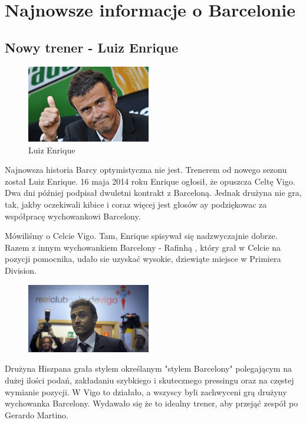 \documentclass[11pt, a4paper]{article}
\begin{document}
\section{Najnowsze informacje o Barcelonie}
\subsection{Nowy trener - Luiz Enrique}
\begin{figure}
\begin{center}
\includegraphics[width=0.48\textwidth]{luzienrique.jpg}
\end{center}
\caption{Luiz Enrique\cite{Enrique}}
\label{img:Luiz}
\end{figure}
Najnowsza historia Barcy optymistyczna nie jest. Trenerem od nowego sezonu został Luiz Enrique.
16 maja 2014 roku Enrique ogłosił, że opuszcza Celtę Vigo. Dwa dni później podpisał dwuletni kontrakt z Barceloną. Jednak drużyna nie gra, tak, jakby oczekiwali kibice i coraz więcej jest głosów ay podziękowac za współpracę wychowankowi Barcelony.

Mówiliśmy o Celcie Vigo. Tam, Enrique spisywał się nadzwyczajnie dobrze. Razem z innym wychowankiem Barcelony - Rafinhą , który grał w Celcie na pozycji pomocnika, udało sie uzyskać wysokie, dziewiąte miejsce w Primiera Division.

\begin{figure}
\begin{center}
\includegraphics[width=0.48\textwidth]{enrique2.jpg}
\end{center}
\label{img:Luiz2}
\end{figure}
Drużyna Hiszpana grała stylem określanym "stylem Barcelony" polegającym na dużej ilości podań, zakładaniu szybkiego i skutecznego pressingu oraz na częstej wymianie pozycji. W Vigo to działało, a wszyscy byli zachwyceni grą drużyny wychowanka Barcelony. Wydawało się że to idealny trener, aby przejąć zespół po Gerardo Martino.
\end{document}
